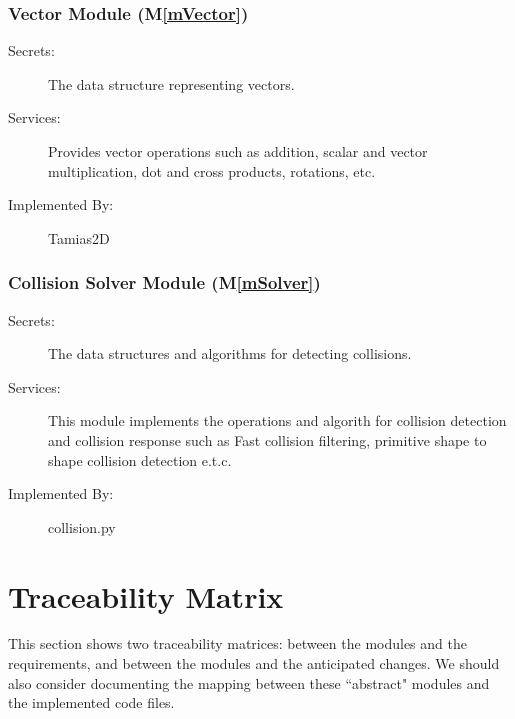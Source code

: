 \documentclass[12pt]{article}
\newcommand{\mref}[1]{M\ref{#1}}
\newcommand{\progname}{Tamias2D}
\begin{document}
\subsubsection{Vector Module (\mref{mVector})}
	
\begin{description}
	\item[Secrets:] The data structure representing vectors.
	\item[Services:] Provides vector operations such as addition, scalar and vector multiplication, dot and cross products, rotations, etc.
	\item[Implemented By:] {\progname}
\end{description}


\subsubsection{Collision Solver Module (\mref{mSolver})}

\begin{description}
	\item[Secrets:] The data structures and algorithms for detecting collisions.
	\item[Services:] This module implements the operations and algorith for collision detection and collision response such as Fast collision filtering, primitive shape to shape collision detection e.t.c.
	\item[Implemented By:] {collision.py}
\end{description}

\section{Traceability Matrix} \label{SecTM}

This section shows two traceability matrices: between the modules and the
requirements, and between the modules and the anticipated changes. We should also consider documenting the mapping between these ``abstract" modules and the implemented code files.
\end{document}
